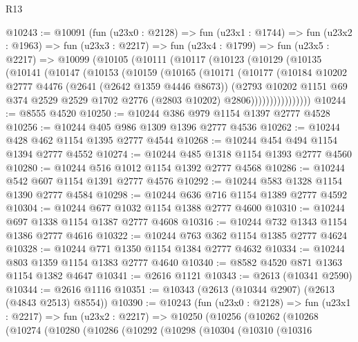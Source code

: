 \begin{lexlean}{R13}
\begin{coremodule}
@10243 := @10091
    (fun (u23x0 : @2128) =>
    fun (u23x1 : @1744) =>
    fun (u23x2 : @1963) =>
    fun (u23x3 : @2217) =>
    fun (u23x4 : @1799) =>
    fun (u23x5 : @2217) =>
    @10099
      (@10105
        (@10111
          (@10117
            (@10123
              (@10129
                (@10135
                  (@10141
                    (@10147
                      (@10153
                        (@10159
                          (@10165
                            (@10171
                              (@10177
                                (@10184
                                  @10202
                                  @2777
                                  @4476
                                  (@2641 (@2642 @1359 @4446 @8673))
                                  (@2793
                                    @10202
                                    @1151
                                    @69
                                    @374
                                    @2529
                                    @2529
                                    @1702
                                    @2776
                                    (@2803 @10202)
                                    @2806))))))))))))))))
@10244 := @8555 @4520
@10250 := @10244 @386 @979 @1154 @1397 @2777 @4528
@10256 := @10244 @405 @986 @1309 @1396 @2777 @4536
@10262 := @10244 @428 @462 @1154 @1395 @2777 @4544
@10268 := @10244 @454 @494 @1154 @1394 @2777 @4552
@10274 := @10244 @485 @1318 @1154 @1393 @2777 @4560
@10280 := @10244 @516 @1012 @1154 @1392 @2777 @4568
@10286 := @10244 @542 @607 @1154 @1391 @2777 @4576
@10292 := @10244 @583 @1328 @1154 @1390 @2777 @4584
@10298 := @10244 @636 @716 @1154 @1389 @2777 @4592
@10304 := @10244 @677 @1032 @1154 @1388 @2777 @4600
@10310 := @10244 @697 @1338 @1154 @1387 @2777 @4608
@10316 := @10244 @732 @1343 @1154 @1386 @2777 @4616
@10322 := @10244 @763 @362 @1154 @1385 @2777 @4624
@10328 := @10244 @771 @1350 @1154 @1384 @2777 @4632
@10334 := @10244 @803 @1359 @1154 @1383 @2777 @4640
@10340 := @8582 @4520 @871 @1363 @1154 @1382 @4647
@10341 := @2616 @1121
@10343 := @2613 (@10341 @2590)
@10344 := @2616 @1116
@10351 := @10343 (@2613 (@10344 @2907) (@2613 (@4843 @2513) @8554))
@10390 := @10243
    (fun (u23x0 : @2128) =>
    fun (u23x1 : @2217) =>
    fun (u23x2 : @2217) =>
    @10250
      (@10256
        (@10262
          (@10268
            (@10274
              (@10280
                (@10286
                  (@10292
                    (@10298
                      (@10304
                        (@10310
                          (@10316

\end{coremodule}
\end{lexlean}
